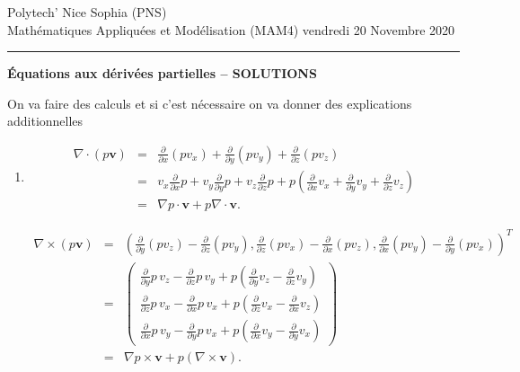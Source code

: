 \documentclass[12pt,a4paper]{article}
\newcommand{\dxx}{\frac{\partial}{\partial x}}
\newcommand{\dxy}{\frac{\partial }{\partial y}}
\newcommand{\dxz}{\frac{\partial}{\partial z}}
\begin{document}
 \hfill Polytech' Nice Sophia (PNS)\\
\noindent Math\'ematiques Appliqu\'ees et Mod\'elisation (MAM4) \hfill vendredi 20 Novembre 2020 \\

\hrule

\bigskip
\bigskip

\begin{center}{\bf \'Equations aux d\'eriv\'ees partielles --
SOLUTIONS}\end{center}

\bigskip
On va faire des calculs et si c'est n\'ecessaire on va donner des explications additionnelles 
\begin{enumerate}
\item 
$$
\begin{array}{ccl}
  \nabla \cdot (p \mathbf{v})&=& \dxx (p v_x)+\dxy (p v_y)+\dxz (p v_z)\\
  &=& v_x \dxx p+v_y \dxy p +v_z \dxz p +p (\dxx v_x+\dxy v_y+\dxz v_z)\\
  &=& \nabla p\cdot \mathbf{v}+p\nabla\cdot \mathbf{v}.
  \end{array}
$$

 $$\begin{array}{ccl}
  \nabla\times (p\mathbf{v})&=&(\dxy(pv_z)-\dxz (pv_y),\dxz (pv_x)-\dxx (pv_z),\dxx (pv_y)-\dxy (pv_x))^T\\
  &=& \left(\begin{array}{c}
  			\dxy p \,v_z -\dxz p \, v_y+p(\dxy v_z-\dxz v_y)\\
  			\dxz p \,v_x -\dxx p \, v_x+p(\dxz v_x-\dxx v_z)\\
  			\dxx p \,v_y -\dxy p \, v_x+p(\dxx v_y-\dxy v_x)		
  	      \end{array}\right)\\
  &=& \nabla p\times \mathbf{v}+p(\nabla \times \mathbf{v}).
  \end{array}
$$


\end{enumerate}
\end{document}
